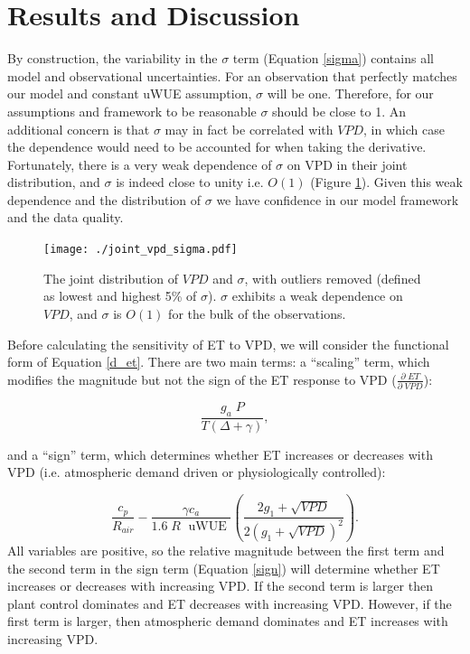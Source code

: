 \section{Results and Discussion}
\label{results}

By construction, the variability in the $\sigma$ term (Equation
\ref{sigma}) contains all model and observational uncertainties. For
an observation that perfectly matches our model and constant uWUE
assumption, $\sigma$ will be one. Therefore, for our assumptions and
framework to be reasonable $\sigma$ should be close to 1. An
additional concern is that $\sigma$ may in fact be correlated with
$VPD$, in which case the dependence would need to be accounted for
when taking the derivative. Fortunately, there is a very weak
dependence of $\sigma$ on VPD in their joint distribution, and
$\sigma$ is indeed close to unity i.e. $O(1)$ (Figure
\ref{joint_vpd_sigma}). Given this weak dependence and the
distribution of $\sigma$ we have confidence in our model framework and
the data quality.

\begin{figure}[h]
  \centering\texttt{[image: ./joint\_vpd\_sigma.pdf]}
  \caption{The joint distribution of $VPD$ and $\sigma$, with outliers
    removed (defined as lowest and highest 5\% of $\sigma$). $\sigma$
    exhibits a weak dependence on $VPD$, and $\sigma$ is $O(1)$ for
    the bulk of the observations.}
  \label{joint_vpd_sigma}
\end{figure}

Before calculating the sensitivity of ET to VPD, we will consider the
functional form of Equation \ref{d_et}. There are two main terms: a
``scaling'' term, which modifies the magnitude but not the sign of the
ET response to VPD ($\frac{\partial \; ET}{\partial \; VPD}$):

\begin{equation}
  \frac{g_a \; P}{T(\Delta + \gamma)},
\end{equation}

and a ``sign'' term, which determines whether ET increases or
decreases with VPD (i.e. atmospheric demand driven or physiologically
controlled):

\begin{equation}
  \label{sign}
  \frac{c_p}{R_{air}} - \frac{\gamma c_a }{1.6 \; R\; \text{ uWUE }} \left( \frac{2 g_1 + \sqrt{VPD}}{2 (g_1 + \sqrt{VPD})^2}\right).
\end{equation}
All variables are positive, so the relative magnitude between the
first term and the second term in the sign term (Equation \ref{sign})
will determine whether ET increases or decreases with increasing
VPD. If the second term is larger then plant control dominates and ET
decreases with increasing VPD. However, if the first term is larger,
then atmospheric demand dominates and ET increases with increasing
VPD.


